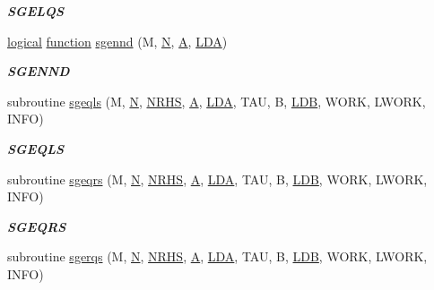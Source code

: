 \begin{DoxyCompactItemize}
\begin{DoxyCompactList}\small\item\em {\bfseries S\+G\+E\+L\+Q\+S} \end{DoxyCompactList}\item 
\hyperlink{tnc_8c_aa7b64cdf39500931f7b333343791a104}{logical} \hyperlink{afunc_8m_a7b5e596df91eadea6c537c0825e894a7}{function} \hyperlink{group__single__lin_ga264cfc721c997beb91e47d3a211da8a8}{sgennd} (M, \hyperlink{polmisc_8c_a0240ac851181b84ac374872dc5434ee4}{N}, \hyperlink{classA}{A}, \hyperlink{example__user_8c_ae946da542ce0db94dced19b2ecefd1aa}{L\+D\+A})
\begin{DoxyCompactList}\small\item\em {\bfseries S\+G\+E\+N\+N\+D} \end{DoxyCompactList}\item 
subroutine \hyperlink{group__single__lin_gaee08998563f9d9e51951616a9b42f76d}{sgeqls} (M, \hyperlink{polmisc_8c_a0240ac851181b84ac374872dc5434ee4}{N}, \hyperlink{example__user_8c_aa0138da002ce2a90360df2f521eb3198}{N\+R\+H\+S}, \hyperlink{classA}{A}, \hyperlink{example__user_8c_ae946da542ce0db94dced19b2ecefd1aa}{L\+D\+A}, T\+A\+U, B, \hyperlink{example__user_8c_a50e90a7104df172b5a89a06c47fcca04}{L\+D\+B}, W\+O\+R\+K, L\+W\+O\+R\+K, I\+N\+F\+O)
\begin{DoxyCompactList}\small\item\em {\bfseries S\+G\+E\+Q\+L\+S} \end{DoxyCompactList}\item 
subroutine \hyperlink{group__single__lin_gad71146d0c76b2eab1d9429aaa175b69f}{sgeqrs} (M, \hyperlink{polmisc_8c_a0240ac851181b84ac374872dc5434ee4}{N}, \hyperlink{example__user_8c_aa0138da002ce2a90360df2f521eb3198}{N\+R\+H\+S}, \hyperlink{classA}{A}, \hyperlink{example__user_8c_ae946da542ce0db94dced19b2ecefd1aa}{L\+D\+A}, T\+A\+U, B, \hyperlink{example__user_8c_a50e90a7104df172b5a89a06c47fcca04}{L\+D\+B}, W\+O\+R\+K, L\+W\+O\+R\+K, I\+N\+F\+O)
\begin{DoxyCompactList}\small\item\em {\bfseries S\+G\+E\+Q\+R\+S} \end{DoxyCompactList}\item 
subroutine \hyperlink{group__single__lin_ga7f72d13b91bedd5eb5bce7565712830a}{sgerqs} (M, \hyperlink{polmisc_8c_a0240ac851181b84ac374872dc5434ee4}{N}, \hyperlink{example__user_8c_aa0138da002ce2a90360df2f521eb3198}{N\+R\+H\+S}, \hyperlink{classA}{A}, \hyperlink{example__user_8c_ae946da542ce0db94dced19b2ecefd1aa}{L\+D\+A}, T\+A\+U, B, \hyperlink{example__user_8c_a50e90a7104df172b5a89a06c47fcca04}{L\+D\+B}, W\+O\+R\+K, L\+W\+O\+R\+K, I\+N\+F\+O)

\end{DoxyCompactItemize}
